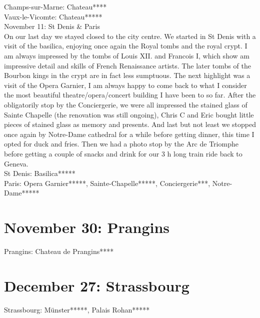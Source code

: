 Champs-sur-Marne: Chateau****\\
Vaux-le-Vicomte: Chateau*****\\

November 11: St Denis \& Paris\\
On our last day we stayed closed to the city centre. We started in St Denis with a visit of the basilica, enjoying once again the Royal tombs and the royal crypt. I am always impressed by the tombs of Louis XII. and Francois I, which show am impressive detail and skills of French Renaissance artists. The later tombs of the Bourbon kings in the crypt are in fact less sumptuous. The next highlight was a visit of the Opera Garnier, I am always happy to come back to what I consider the most beautiful theatre/opera/concert building I have been to so far. After the obligatorily stop by the Conciergerie, we were all impressed the stained glass of Sainte Chapelle (the renovation was still ongoing), Chris C and Eric bought little pieces of stained glass as memory and presents. And last but not least we stopped once again by Notre-Dame cathedral for a while before getting dinner, this time I opted for duck and fries. Then we had a photo stop by the Arc de Triomphe before getting a couple of snacks and drink for our 3 h long train ride back to Geneva.\\

St Denis: Basilica*****\\
Paris: Opera Garnier*****, Sainte-Chapelle*****, Conciergerie***, Notre-Dame*****

\section{November 30: Prangins}
\label{2013:Prangins}

Prangins: Chateau de Prangins****

\section{December 27: Strassbourg}
\label{2013Strassbourg}

Strassbourg: M\"unster*****, Palais Rohan*****